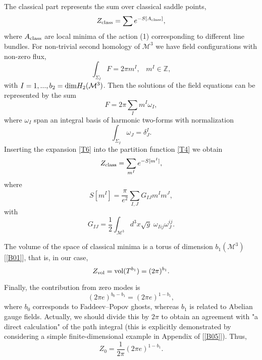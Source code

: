 \documentclass[a4paper,12pt]{article}
\begin{document}
The classical part represents the sum over classical saddle
points,
\begin{equation}\label{T4}
Z_{\rm class}=\sum e^{-S[A_{\rm class}]},
\end{equation}
where $A_{\rm class}$ are local minima of the action (1)
corresponding to different line bundles. For non-trivial second
homology of $\mathcal{M}^{3}$ we have field configurations with
non-zero flux,
\begin{equation}\label{T5}
\int_{\Sigma_{I}}F = 2 \pi m^{I}, \;\;\; m^{I} \in \mathbb{Z},
\end{equation}
with $I= 1,...,b_{2}={\rm dim} H_{2}(\mathcal{M}^{3})$. Then the
solutions of the field equations can be represented by the sum
\begin{equation}\label{T6}
F=2 \pi \sum_{ I } m^{ I } \omega_{ I },
\end{equation}
where $\omega_{I}$ span an integral basis of harmonic two-forms
with normalization
\begin{equation}\label{T7}
\int_{\Sigma_{ I}} \omega_{J}=\delta_{J}^{I}.
\end{equation}
Inserting the expansion \eqref{T6} into the partition function \eqref{T4} we obtain
\begin{equation}\label{T8}
Z_{\rm class}=\sum_{m^{I}} e^{- S[m^{I}]},
\end{equation}
where
\begin{equation}\label{T9}
S[m^{I}]=\frac{\pi}{e^{2}} \sum_{I,J} G_{IJ} m^{I} m^{J},
\end{equation}
with
\begin{equation}\label{T10}
G_{IJ}=\frac{1}{2} \int_{\mathcal{M}^{3}} d^{3}x
\sqrt{g}\; \omega_{Iij}\omega_{J}^{ij}.
\end{equation}

The volume of the space of classical minima is a torus of dimension
$b_{1}(\mathcal{M}^{3})$ [\ref{B01}], that is,
in our case,
\begin{equation}\label{T11}
Z_{\rm vol}={\rm vol}(T^{b_{1}})=(2\pi)^{b_{1}}.
\end{equation}

Finally, the contribution from zero modes is
\begin{equation}
(2\pi e)^{b_{0}-b_{1}}=(2\pi e)^{1-b_{1}},
\end{equation}
where $b_{0}$ corresponds to Faddeev--Popov ghosts, whereas $b_{1}$ is related to Abelian gauge fields.
Actually, we should divide this by $2\pi$ to obtain an agreement
with "a direct calculation" of the path integral (this is
explicitly demonstrated by considering a simple finite-dimensional
example in Appendix of [\ref{B05}]).
Thus,
\begin{equation}\label{T12}
Z_{0}=\frac{1}{2\pi}(2\pi e)^{1-b_{1}}.
\end{equation}
\end{document}
